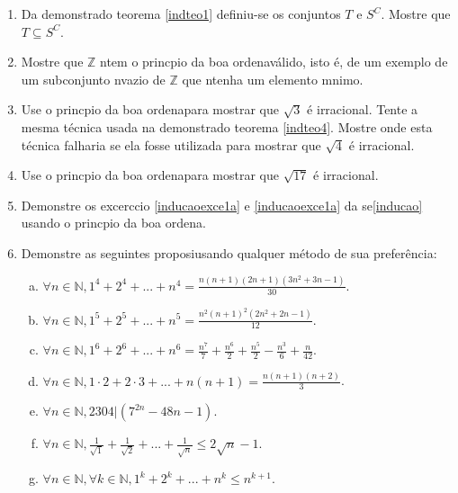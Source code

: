 \begin{enumerate}[{\bf 1.}]

\item Da demonstra\cao do teorema \ref{indteo1} definiu-se os conjuntos $T$ e $S^C$. Mostre que $T\subseteq S^C$.

\item Mostre que $\mathbb{Z}$ n\ao tem o princ\ih pio da boa ordena\cao v\'alido, isto \'e, de um exemplo de um subconjunto n\ao vazio de $\mathbb{Z}$ que n\ao tenha um elemento m\ih nimo.

\item Use o princ\ih pio da boa ordena\cao para mostrar que $\sqrt{3}$ \'e irracional. Tente a mesma t\'ecnica usada na demonstra\cao do teorema \ref{indteo4}. Mostre onde esta t\'ecnica falharia se ela fosse utilizada para mostrar que $\sqrt{4}$ \'e irracional.

\item Use o princ\ih pio da boa ordena\cao para mostrar que $\sqrt{17}$ \'e irracional.

\item Demonstre os excerc\ih cio \ref{inducaoexce1a} e \ref{inducaoexce1a} da se\cao \ref{inducao} usando o princ\ih pio da boa ordena\caoi.

\item Demonstre as seguintes proposi\cois usando qualquer m\'etodo de sua prefer\^encia:
\begin{enumerate}[a)]
\item $\forall n\in\mathbb{N}, 1^4+2^4+...+n^4=\displaystyle\frac{n(n+1)(2n+1)(3n^2+3n-1)}{30}$.
\item $\forall n\in\mathbb{N}, 1^5+2^5+...+n^5=\displaystyle\frac{n^2(n+1)^2(2n^2+2n-1)}{12}$.
\item $\forall n\in\mathbb{N}, 1^6+2^6+...+n^6=\displaystyle\frac{n^7}{7}+\frac{n^6}{2}+\frac{n^5}{2}-\frac{n^3}{6}+\frac{n}{42}$.
\item $\forall n\in\mathbb{N}, 1\cdot 2+ 2\cdot 3+...+n(n+1)=\displaystyle\frac{n(n+1)(n+2)}{3}$.
\item $\forall n\in\mathbb{N}, 2304|(7^{2n}-48n-1)$.
\item $\forall n\in\mathbb{N}, \displaystyle\frac{1}{\sqrt{1}}+\frac{1}{\sqrt{2}}+...+\frac{1}{\sqrt{n}}\leq 2\sqrt{n}-1$.
\item $\forall n\in\mathbb{N}, \forall k\in\mathbb{N}, 1^k+2^k+...+n^k\leq n^{k+1}$.
\end{enumerate}


\end{enumerate}
